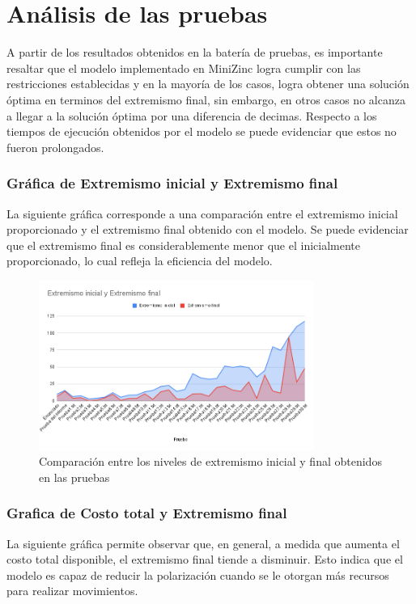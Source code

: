 \documentclass[11pt,letter]{article}
\begin{document}
\section{Análisis de las pruebas}

A partir de los resultados obtenidos en la batería de pruebas, es importante resaltar que el modelo implementado en MiniZinc logra cumplir con las restricciones establecidas y en la mayoría de los casos, logra obtener una solución óptima en terminos del extremismo final, sin embargo, en otros casos no alcanza a llegar a la solución óptima por una diferencia de decimas. Respecto a los tiempos de ejecución obtenidos por el modelo se puede evidenciar que estos no fueron prolongados.


\subsubsection*{Gráfica de Extremismo inicial y Extremismo final}
La siguiente gráfica corresponde a una comparación entre el extremismo inicial proporcionado y el extremismo final obtenido con el modelo. Se puede evidenciar que el extremismo final es considerablemente menor que el inicialmente proporcionado, lo cual refleja la eficiencia del modelo.
\begin{figure}[H]
    \centering
    \includegraphics[width=0.8\textwidth]{resources/extremismoiyf.png}
    \caption{Comparación entre los niveles de extremismo inicial y final obtenidos en las pruebas}
\end{figure}

\subsubsection*{Grafica de Costo total y Extremismo final}
La siguiente gráfica permite observar que, en general, a medida que aumenta el costo total disponible, el extremismo final tiende a disminuir. Esto indica que el modelo es capaz de reducir la polarización cuando se le otorgan más recursos para realizar movimientos. 
\end{document}
